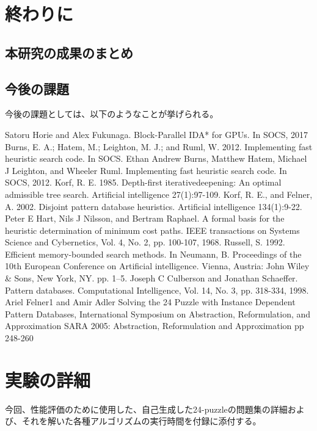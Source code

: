 \documentclass[a4paper,11pt,oneside,openany]{jsbook}
\begin{document}
\chapter{終わりに}
\section{本研究の成果のまとめ}

\section{今後の課題}
今後の課題としては、以下のようなことが挙げられる。




\begin{thebibliography}{10}
   Satoru Horie and Alex Fukunaga. Block-Parallel IDA* for GPUs. In SOCS, 2017 
   Burns, E. A.; Hatem, M.; Leighton,  M. J.; and Ruml, W. 2012. Implementing fast heuristic search code. In SOCS.
  Ethan Andrew Burns, Matthew Hatem, Michael J Leighton, and Wheeler Ruml. Implementing fast heuristic search code. In SOCS, 2012.
  Korf, R. E. 1985. Depth-first iterativedeepening: An optimal admissible tree search. Artificial intelligence 27(1):97-109.
  Korf, R. E., and Felner, A. 2002. Disjoint pattern database heuristics. Artificial intelligence 134(1):9-22.
  Peter E Hart, Nils J Nilsson, and Bertram Raphael. A formal basis for the heuristic determination of minimum cost paths. IEEE transactions on Systems Science and Cybernetics, Vol. 4, No. 2, pp. 100-107, 1968. 
  Russell, S. 1992. Efficient memory-bounded search methods. In Neumann, B. Proceedings of the 10th European Conference on Artificial intelligence. Vienna, Austria: John Wiley \& Sons, New York, NY. pp. 1–5.
  Joseph C Culberson and Jonathan Schaeffer. Pattern databases. Computational Intelligence, Vol. 14, No. 3, pp. 318-334, 1998.
  Ariel Felner1 and Amir Adler Solving the 24 Puzzle with Instance Dependent Pattern Databases, International Symposium on Abstraction, Reformulation, and Approximation SARA 2005: Abstraction, Reformulation and Approximation pp 248-260

\end{thebibliography}

\appendix
\chapter{実験の詳細}
今回、性能評価のために使用した、自己生成した24-puzzleの問題集の詳細および、それを解いた各種アルゴリズムの実行時間を付録に添付する。
\end{document}
